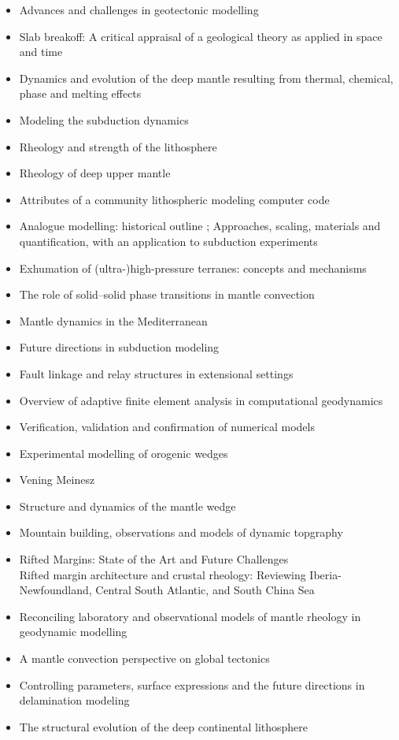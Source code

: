 \begin{itemize}
\item Advances and challenges in geotectonic modelling \cite{bufy14}
\item Slab breakoff: A critical appraisal of a geological theory as applied in space and time \cite{garm18}
\item Dynamics and evolution of the deep mantle resulting from thermal, chemical, phase and melting effects \cite{tack12}
\item Modeling the subduction dynamics \cite{kinc95,bill08}
\item Rheology and strength of the lithosphere \cite{kirb83,buro11}
\item Rheology of deep upper mantle \cite{kara10}
\item Attributes of a community lithospheric modeling computer code \cite{comc15}
\item Analogue modelling: historical outline \cite{koyi97}; Approaches, scaling, materials and quantification, with an application to subduction experiments \cite{scst16}
\item Exhumation of (ultra-)high-pressure terranes: concepts and mechanisms \cite{warr13}
\item The role of solid–solid phase transitions in mantle convection \cite{fada17}
\item Mantle dynamics in the Mediterranean \cite{faba14}
\item Future directions in subduction modeling \cite{gery11}
\item Fault linkage and relay structures in extensional settings \cite{foro16}
\item Overview of adaptive finite element analysis in computational geodynamics \cite{masm13}
\item Verification, validation and confirmation of numerical models \cite{orsb94}
\item Experimental modelling of orogenic wedges \cite{grmd12}
\item Vening Meinesz \cite{vlaa89}
\item Structure and dynamics of the mantle wedge \cite{vank03}
\item Mountain building, observations and models of dynamic topgraphy \cite{flgm13,fabc13}
\item Rifted Margins: State of the Art and Future Challenges \cite{pema19}\\
      Rifted margin architecture and crustal rheology: Reviewing
Iberia-Newfoundland, Central South Atlantic, and South China Sea \cite{brhc17}
\item Reconciling laboratory and observational models of mantle rheology in geodynamic modelling \cite{king16}
\item A mantle convection perspective on global tectonics \cite{cogu17}
\item Controlling parameters, surface expressions and the future directions in delamination modeling \cite{goue18}
\item The structural evolution of the deep continental lithosphere \cite{comm17}
\end{itemize}

